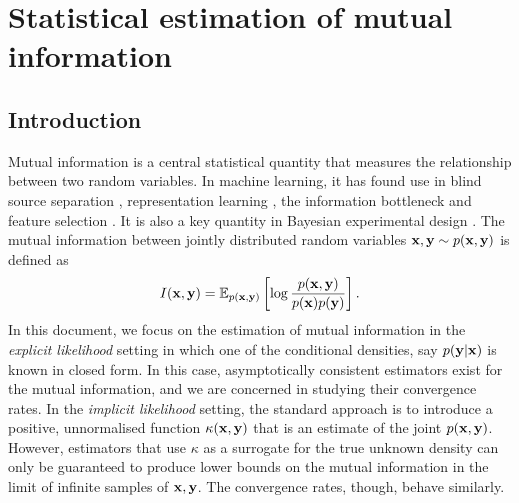 \documentclass[a4paper, 10pt]{report}
\theoremstyle{plain}
\begin{document}
	
	
	
	
	
	
	\clearpage
	\section{Statistical estimation of mutual information}
	\label{sec:estimators}
	
	
	\subsection{Introduction}
	Mutual information is a central statistical quantity that measures the relationship between two random variables.
	In machine learning, it has found use in blind source separation \citep{hyvarinen1999survey}, representation learning \citep{oord2018representation}, the information bottleneck \citep{tishby2000information} and feature selection \citep{kwak2002input}. It is also a key quantity in Bayesian experimental design \citep{lindley1956}.
	The mutual information between jointly distributed random variables ${\mathbf{x}},{\mathbf{y}} \sim p({\mathbf{x}},{\mathbf{y}})$ is defined as
	\begin{equation}
	I({\mathbf{x}},{\mathbf{y}}) = \mathbb{E}_{p({\mathbf{x}},{\mathbf{y}})}\left[ \log \frac{p({\mathbf{x}},{\mathbf{y}})}{p({\mathbf{x}})p({\mathbf{y}})} \right].
	\end{equation}
	In this document, we focus on the estimation of mutual information in the \emph{explicit likelihood} setting in which one of the conditional densities, say $p({\mathbf{y}}|{\mathbf{x}})$ is known in closed form.
	In this case, asymptotically consistent estimators exist for the mutual information, and we are concerned in studying their convergence rates.
	In the \emph{implicit likelihood} setting, the standard approach is to introduce a positive, unnormalised function $\kappa({\mathbf{x}},{\mathbf{y}})$ that is an estimate of the joint $p({\mathbf{x}},{\mathbf{y}})$. However, estimators that use $\kappa$ as a surrogate for the true unknown density can only be guaranteed to produce lower bounds on the mutual information in the limit of infinite samples of ${\mathbf{x}},{\mathbf{y}}$.
	The convergence rates, though, behave similarly.
	
\end{document}
